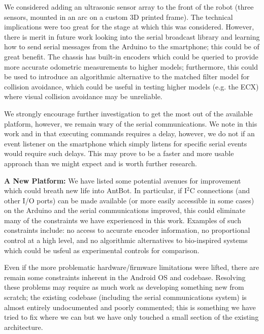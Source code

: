 \documentclass[a4paper,11pt,twoside,openright]{article}
\begin{document}
We considered adding an ultrasonic sensor array to the front of the
robot (three sensors, mounted in an arc on a custom 3D printed
frame). The technical implications were too great for the stage at
which this was considered. However, there is merit in future work
looking into the serial broadcast library and learning how to send
serial messages from the Arduino to the smartphone; this could be of
great benefit. The chassis has built-in encoders which could be
queried to provide more accurate odometric measurements to higher
models; furthermore, this could be used to introduce an algorithmic
alternative to the matched filter model for collision avoidance, which
could be useful in testing higher models (e.g. the ECX) where visual
collision avoidance may be unreliable.
\newline\par

We strongly encourage further investigation to get the most out of the
available platform, however, we remain wary of the serial
communications. We note in this work and in \cite{Mitchell2018} that
executing commands requires a delay, however, we do not if an event
listener on the smartphone which simply listens for specific serial
events would require such delays. This may prove to be a faster and
more usable approach than we might expect and is worth
further research.\newline\par



\textbf{A New Platform:} We have listed some potential avenues for
improvement which could breath new life into AntBot. In particular, if
I$^2$C connections (and other I/O ports) can be made available (or
more easily accessible in some cases) on the Arduino and the serial
communications improved, this could eliminate many of the constraints
we have experienced in this work. Examples of such constraints
include: no access to accurate encoder information, no proportional
control at a high level, and no algorithmic alternatives to
bio-inspired systems which could be usfeul as experimental controls
for comparison.
\newline\par

Even if the more problematic hardware/firmware limitations were lifted, there
are remain some constraints inherent in the Android OS and codebase.
Resolving these problems may require as much work as developing
something new from scratch; the existing codebase (including the
serial communications system) is almost entirely undocumented and
poorly commented; this is something we have tried to fix where we can
but we have only touched a small section of the existing architecture.
\newline\par
\end{document}
